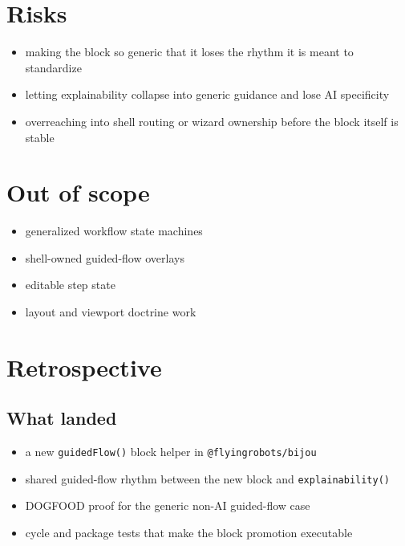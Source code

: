 \section{Risks}\label{record-175-risks}

\begin{itemize}
\tightlist
\item
  making the block so generic that it loses the rhythm it is meant to standardize
\item
  letting explainability collapse into generic guidance and lose AI specificity
\item
  overreaching into shell routing or wizard ownership before the block itself is stable
\end{itemize}

\section{Out of scope}\label{record-175-out-of-scope}

\begin{itemize}
\tightlist
\item
  generalized workflow state machines
\item
  shell-owned guided-flow overlays
\item
  editable step state
\item
  layout and viewport doctrine work
\end{itemize}

\section{Retrospective}\label{record-175-retrospective}

\subsection{What landed}\label{record-175-what-landed}

\begin{itemize}
\tightlist
\item
  a new \texttt{g\allowbreak{}u\allowbreak{}i\allowbreak{}d\allowbreak{}e\allowbreak{}d\allowbreak{}F\allowbreak{}l\allowbreak{}o\allowbreak{}w\allowbreak{}(\allowbreak{})} block helper in \texttt{@\allowbreak{}f\allowbreak{}l\allowbreak{}y\allowbreak{}i\allowbreak{}n\allowbreak{}g\allowbreak{}r\allowbreak{}o\allowbreak{}b\allowbreak{}o\allowbreak{}t\allowbreak{}s\allowbreak{}/\allowbreak{}b\allowbreak{}i\allowbreak{}j\allowbreak{}o\allowbreak{}u}
\item
  shared guided-flow rhythm between the new block and \texttt{e\allowbreak{}x\allowbreak{}p\allowbreak{}l\allowbreak{}a\allowbreak{}i\allowbreak{}n\allowbreak{}a\allowbreak{}b\allowbreak{}i\allowbreak{}l\allowbreak{}i\allowbreak{}t\allowbreak{}y\allowbreak{}(\allowbreak{})}
\item
  DOGFOOD proof for the generic non-AI guided-flow case
\item
  cycle and package tests that make the block promotion executable
\end{itemize}

